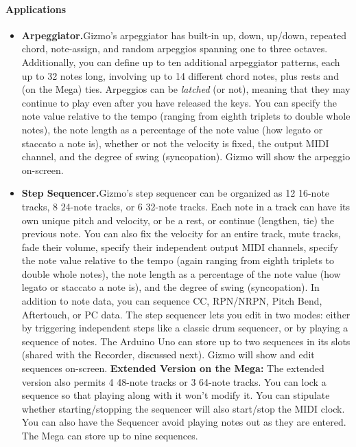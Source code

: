 \documentclass{article}
\begin{document}
\paragraph{Applications}
\begin{itemize}
\item {\bf Arpeggiator.}\quad Gizmo's arpeggiator has built-in up, down, up/down, repeated chord, note-assign, and random arpeggios spanning one to three octaves.  Additionally, you can define up to ten additional arpeggiator patterns, each up to 32 notes long, involving up to 14 different chord notes, plus rests and (on the Mega) ties.  Arpeggios can be {\it latched} (or not), meaning that they may continue to play even after you have released the keys.  You can specify  the note value relative to the tempo (ranging from eighth triplets to double whole notes), the note length as a percentage of the note value (how legato or staccato a note is), whether or not the velocity is fixed, the output MIDI channel, and the degree of swing (syncopation).  Gizmo will show the arpeggio on-screen.

\item {\bf Step Sequencer.}\quad Gizmo's step sequencer can be organized as 12 16-note tracks, 8 24-note tracks, or 6 32-note tracks.  Each note in a track can have its own unique pitch and velocity, or be a rest, or continue (lengthen, tie) the previous note.  You can also fix the velocity for an entire track, mute tracks, fade their volume, specify their independent output MIDI channels, specify the note value relative to the tempo (again ranging from eighth triplets to double whole notes), the note length as a percentage of the note value (how legato or staccato a note is), and the degree of swing (syncopation).   In addition to note data, you can sequence CC, RPN/NRPN, Pitch Bend, Aftertouch, or PC data.  The step sequencer lets you edit in two modes: either by triggering independent steps like a classic drum sequencer, or by playing a sequence of notes.  The Arduino Uno can store up to two sequences in its slots (shared with the Recorder, discussed next).  Gizmo will show and edit sequences on-screen.  {\bf Extended Version on the Mega:} The extended version also permits 4 48-note tracks or 3 64-note tracks.  You can lock a sequence so that playing along with it won't modify it.  You can stipulate whether starting/stopping the sequencer will also start/stop the MIDI clock.  You can also have the Sequencer avoid playing notes out as they are entered.  The Mega can store up to nine sequences.


\end{itemize}
\end{document}

